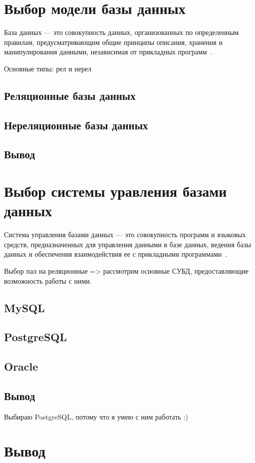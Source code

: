 \section{Выбор модели базы данных}

База данных --- это совокупность данных, организованных по определенным
правилам, предусматривающим общие принципы описания, хранения и манипулирования
данными, независимая от прикладных программ~\cite{gost01}.

Основные типы: рел и нерел

\subsection{Реляционные базы данных}

\subsection{Нереляционные базы данных}

\subsection*{Вывод}

\section{Выбор системы уравления базами данных}

Система управления базами данных --- это совокупность программ и языковых
средств, предназначенных для управления данными в базе данных, ведения базы
данных и обеспечения взаимодействия ее с прикладными программами~\cite{gost01}.

Выбор пал на реляционные => рассмотрим основные СУБД, предоставляющие
возможность работы с ними.

\subsection{MySQL}

\subsection{PostgreSQL}

\subsection{Oracle}

\subsection*{Вывод}

Выбираю PostgreSQL, потому что я умею с ним работать :)

\section*{Вывод}
